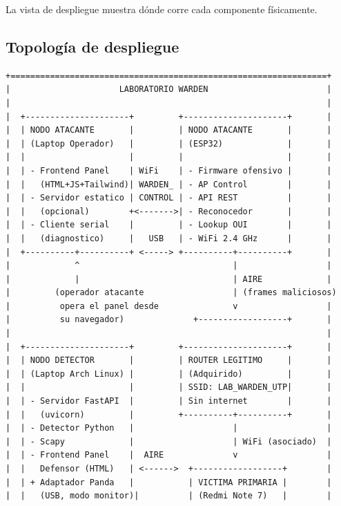 \documentclass[11pt,a4paper]{article}
\begin{document}
La vista de despliegue muestra dónde corre cada componente físicamente.

\subsection{Topología de despliegue}

\vspace{0.3cm}
\begin{verbatim}
+================================================================+
|                      LABORATORIO WARDEN                        |
|                                                                |
|  +---------------------+         +---------------------+       |
|  | NODO ATACANTE       |         | NODO ATACANTE       |       |
|  | (Laptop Operador)   |         | (ESP32)             |       |
|  |                     |         |                     |       |
|  | - Frontend Panel    | WiFi    | - Firmware ofensivo |       |
|  |   (HTML+JS+Tailwind)| WARDEN_ | - AP Control        |       |
|  | - Servidor estatico | CONTROL | - API REST          |       |
|  |   (opcional)        +<------->| - Reconocedor       |       |
|  | - Cliente serial    |         | - Lookup OUI        |       |
|  |   (diagnostico)     |   USB   | - WiFi 2.4 GHz      |       |
|  +----------+----------+ <-----> +----------+----------+       |
|             ^                               |                  |
|             |                               | AIRE             |
|         (operador atacante                  | (frames maliciosos)
|          opera el panel desde               v                  |
|          su navegador)              +------------------+       |
|                                                                |
|  +---------------------+         +---------------------+       |
|  | NODO DETECTOR       |         | ROUTER LEGITIMO     |       |
|  | (Laptop Arch Linux) |         | (Adquirido)         |       |
|  |                     |         | SSID: LAB_WARDEN_UTP|       |
|  | - Servidor FastAPI  |         | Sin internet        |       |
|  |   (uvicorn)         |         +----------+----------+       |
|  | - Detector Python   |                    |                  |
|  | - Scapy             |                    | WiFi (asociado)  |
|  | - Frontend Panel    |  AIRE              v                  |
|  |   Defensor (HTML)   | <------>  +------------------+        |
|  | + Adaptador Panda   |           | VICTIMA PRIMARIA |        |
|  |   (USB, modo monitor)|          | (Redmi Note 7)   |        |

\end{verbatim}
\end{document}

